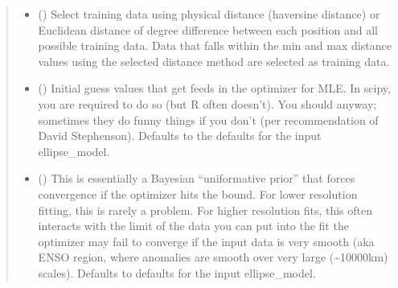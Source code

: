 \documentclass[letterpaper,10pt,english]{sphinxmanual}
\begin{document}
\begin{fulllineitems}
\begin{quote}
\begin{description}
\begin{itemize}
\sphinxAtStartPar
But it is non trivial for anistropic cases,
you have to define a set of orthogonal space. In HadSST4,
Earth is assumed to be cylindrical “tin can” Earth,
so you can just define the orthogonal space by
lines of constant lat and lon (delta\_x\_method=”Met\_Office”).

\sphinxAtStartPar
The modified “Modified\_Met\_Office” is a variation to that,
but allow the tin can get squished at the poles.
(Sinusoidal projection). This does results in a problem:
the zonal displacement now depends in which latitude
you compute on (at the beginning latitude or at the end latitude).
Here we take the average of the two.

\sphinxAtStartPar
Defaults to “Modified\_Met\_Office”.


\item {}
\sphinxAtStartPar
{} () \textendash{} Select training data using physical distance (haversine distance) or
Euclidean distance of degree difference between each position and
all possible training data. Data that falls within the min and max
distance values using the selected distance method are selected as
training data.

\item {}
\sphinxAtStartPar
{} () \textendash{} Initial guess values that get feeds in the optimizer for MLE.
In scipy, you are required to do so (but R often doesn’t).
You should anyway; sometimes they do funny things
if you don’t (per recommendation of David Stephenson).
Defaults to the defaults for the input ellipse\_model.

\item {}
\sphinxAtStartPar
{} () \textendash{} This is essentially a Bayesian “uniformative prior”
that forces convergence if the optimizer hits the bound.
For lower resolution fitting, this is rarely a problem.
For higher resolution fits, this often interacts with
the limit of the data you can put into the fit the optimizer
may fail to converge if the input data is very smooth (aka ENSO
region, where anomalies are smooth over very large (\textasciitilde{}10000km)
scales). Defaults to defaults for the input ellipse\_model.


\end{itemize}
\end{description}
\end{quote}
\end{fulllineitems}
\end{document}
